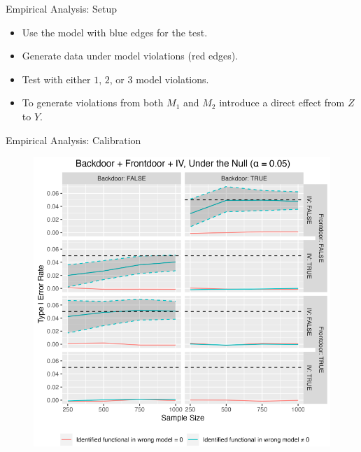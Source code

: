 \documentclass{beamer}
\begin{document}
\begin{frame}{Empirical Analysis: Setup}
\begin{figure}
\begin{subfigure}{0.33 \textwidth}
		\end{subfigure}
	\end{figure}

	\begin{itemize}
		\item Use the model with blue edges for the test.
		\item Generate data under model violations (red edges).
		\item Test with either $1$, $2$, or $3$ model violations.
		\item To generate violations from both $M_1$ and $M_2$ introduce a direct effect from $ Z $ to $ Y $.
	\end{itemize}
\end{frame}

\begin{frame}{Empirical Analysis: Calibration}
	\begin{figure}
		\center
		\includegraphics[scale=0.3]{calibration.png}
	\end{figure}
\end{frame}
\end{document}

